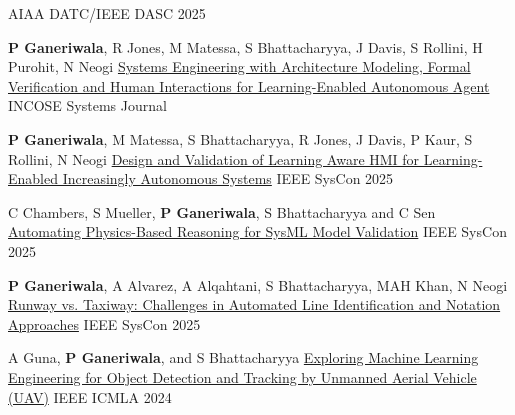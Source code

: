 \begin{cventries}
{}
{AIAA DATC/IEEE DASC 2025} 
{ %
\begin{cvitems}
\end{cvitems}
}
\cventry
{\textbf{P Ganeriwala}, R Jones, M Matessa, S Bhattacharyya, J Davis, S Rollini, H Purohit, N Neogi}
{\href{https://incose.onlinelibrary.wiley.com/doi/10.1002/sys.21816?af=R}{Systems Engineering with Architecture Modeling, Formal Verification and Human Interactions for Learning-Enabled Autonomous Agent}}
{}
{INCOSE Systems Journal} 
{ %
\begin{cvitems}
\end{cvitems}
}
\cventry
{\textbf{P Ganeriwala}, M Matessa, S Bhattacharyya, R Jones, J Davis, P Kaur, S Rollini, N Neogi}
{\href{https://ieeexplore.ieee.org/document/11014784}{Design and Validation of Learning Aware HMI for Learning-Enabled Increasingly Autonomous Systems}}
{}
{IEEE SysCon 2025} 
{ %
\begin{cvitems}
\end{cvitems}
}
\cventry
{C Chambers, S Mueller, \textbf{P Ganeriwala}, S Bhattacharyya and C Sen}
{\href{https://ieeexplore.ieee.org/document/11014788}{Automating Physics-Based Reasoning for SysML Model Validation}}
{}
{IEEE SysCon 2025} 
{ %
\begin{cvitems}
\end{cvitems}
}
\cventry
{\textbf{P Ganeriwala}, A Alvarez, A Alqahtani, S Bhattacharyya, MAH Khan, N Neogi}
{\href{https://ieeexplore.ieee.org/document/11014782}{Runway vs. Taxiway: Challenges in Automated Line Identification and Notation Approaches}}
{}
{IEEE SysCon 2025} 
{ %
\begin{cvitems}
\end{cvitems}
}
\cventry
{A Guna, \textbf{P Ganeriwala}, and S Bhattacharyya}
{\href{https://ieeexplore.ieee.org/document/10903281}{Exploring Machine Learning Engineering for Object Detection and Tracking by Unmanned Aerial Vehicle (UAV)}}
{}
{IEEE ICMLA 2024} 
{ %
\begin{cvitems}

\end{cvitems}}
\end{cventries}
